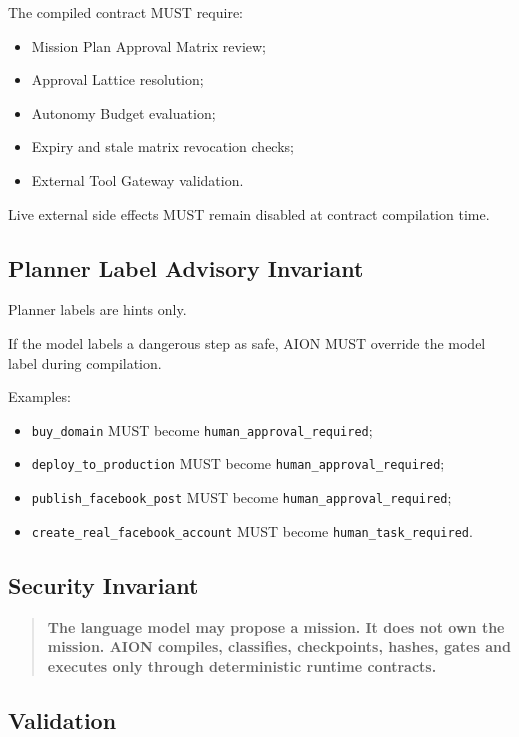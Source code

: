 The compiled contract MUST require:

\begin{itemize}
  \item Mission Plan Approval Matrix review;
  \item Approval Lattice resolution;
  \item Autonomy Budget evaluation;
  \item Expiry and stale matrix revocation checks;
  \item External Tool Gateway validation.
\end{itemize}

Live external side effects MUST remain disabled at contract compilation time.

\subsection{Planner Label Advisory Invariant}

Planner labels are hints only.

If the model labels a dangerous step as safe, AION MUST override the model label during compilation.

Examples:

\begin{itemize}
  \item \texttt{buy\_domain} MUST become \texttt{human\_approval\_required};
  \item \texttt{deploy\_to\_production} MUST become \texttt{human\_approval\_required};
  \item \texttt{publish\_facebook\_post} MUST become \texttt{human\_approval\_required};
  \item \texttt{create\_real\_facebook\_account} MUST become \texttt{human\_task\_required}.
\end{itemize}

\subsection{Security Invariant}

\begin{quote}
\textbf{The language model may propose a mission. It does not own the mission. AION compiles, classifies, checkpoints, hashes, gates and executes only through deterministic runtime contracts.}
\end{quote}

\subsection{Validation}

